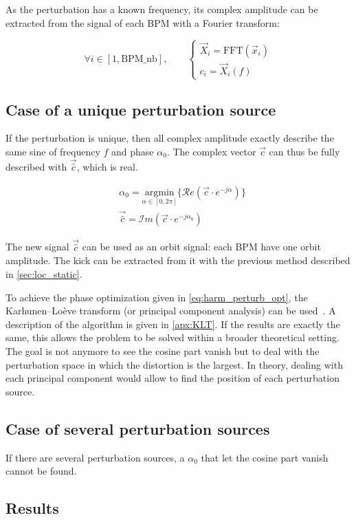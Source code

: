 As the perturbation has a known frequency, its complex amplitude can be extracted from the signal of each BPM with a Fourier transform:

\begin{equation}
\forall i \in [1, \mathrm{BPM\_nb}], \qquad 
\begin{cases}
\vec{X}_i = \mathrm{FFT}(\vec{x}_i) \\
c_i = \vec{X}_i(f)
\end{cases}
\end{equation}

\subsection{Case of a unique perturbation source}
If the perturbation is unique, then all complex amplitude exactly describe the same sine of frequency $f$ and phase $\alpha_0$. The complex vector $\vec{c}$ can thus be fully described with $\vec{\hat{c}}$, which is real.

\begin{align}
&\alpha_0 = \underset{\alpha \in [0, 2\pi]}{\textrm{argmin}}\{\mathcal{R}e (\vec{c} \cdot e^{-j\alpha}) \} \label{eq:harm_perturb_opt}\\
&\vec{\hat{c}} = \mathcal{I}m (\vec{c} \cdot e^{-j\alpha_0})
\end{align}

The new signal $\vec{\hat{c}}$ can be used as an orbit signal: each BPM have one orbit amplitude. The kick can be extracted from it with the previous method described in \cref{sec:loc_static}.

\remark To achieve the phase optimization given in \cref{eq:harm_perturb_opt}, the Karhunen–Loève transform (or principal component analysis) can be used~\cite{book:wang_2012}. A description of the algorithm is given in \cref{apx:KLT}. If the results are exactly the same, this allows the problem to be solved within a broader theoretical setting. The goal is not anymore to see the cosine part vanish but to deal with the perturbation space in which the distortion is the largest. In theory, dealing with each principal component would allow to find the position of each perturbation source.

\subsection{Case of several perturbation sources}
If there are several perturbation sources, a $\alpha_0$ that let the cosine part vanish cannot be found. 


\subsection{Results}

